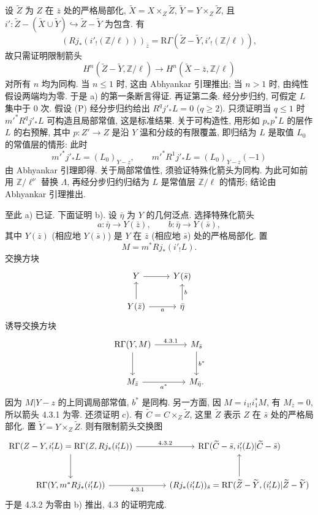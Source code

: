 设 $\widetilde Z$ 为 $Z$ 在 $\bar z$ 处的严格局部化, $\widetilde X=X\times_Z\widetilde Z$, $\widetilde Y=Y\times_Z\widetilde Z$, 且 $i':\widetilde Z-(\widetilde X\cup\widetilde Y)\hookrightarrow \widetilde Z-\widetilde Y$ 为包含. 有
\[
(Rj_*(i'_!(\mathbb Z/\ell)))_{\bar z}
=\mathrm R\Gamma(\widetilde Z-\widetilde Y,i'_!(\mathbb Z/\ell)),
\]
故只需证明限制箭头
\[
H^n(\widetilde Z-\widetilde Y,\mathbb Z/\ell)
\longrightarrow
H^n(\widetilde X-\bar z,\mathbb Z/\ell)
\]
对所有 $n$ 均为同构. 当 $n\le1$ 时, 这由 Abhyankar 引理推出; 当 $n>1$ 时, 由纯性假设两端均为零. 于是 a) 的第一条断言得证. 再证第二条. 经分步归约, 可假定 $L$ 集中于 $0$ 次. 假设 (P) 经分步归约给出 $R^qj'_*L=0$ ($q\ge2$). 只须证明当 $q\le1$ 时 $m'^*R^qj'_*L$ 可构造且局部常值, 这是标准结果. 关于可构造性, 用形如 $p_*p^*L$ 的层作 $L$ 的右预解, 其中 $p:Z'\to Z$ 是沿 $Y$ 温和分歧的有限覆盖, 即归结为 $L$ 是取值 $L_0$ 的常值层的情形: 此时
\[
m'^*j'_*L=(L_0)_{Y-z},
\qquad
m'^*R^1j'_*L=(L_0)_{Y-z}(-1)
\]
由 Abhyankar 引理即得. 关于局部常值性, 须验证特殊化箭头为同构. 为此可如前用 $\mathbb Z/\ell^\nu$ 替换 $\Lambda$, 再经分步归约归结为 $L$ 是常值层 $\mathbb Z/\ell$ 的情形; 结论由 Abhyankar 引理推出.

至此 a) 已证. 下面证明 b). 设 $\bar\eta$ 为 $Y$ 的几何泛点. 选择特殊化箭头
\[
a:\bar\eta\to Y(\bar z),\qquad b:\bar\eta\to Y(\bar s),
\]
其中 $Y(\bar z)$ (相应地 $Y(\bar s)$) 是 $Y$ 在 $\bar z$ (相应地 $\bar s$) 处的严格局部化. 置
\[
M=m^*Rj_*(i'_!L).
\]
交换方块
\[
\begin{tikzcd}
Y \arrow[r] & Y(\bar s)\\
Y(\bar z) \arrow[u] \arrow[r,"a"'] & \bar\eta \arrow[u,"b"']
\end{tikzcd}
\]
诱导交换方块
\[
\begin{tikzcd}[column sep=large,row sep=large]
\mathrm R\Gamma(Y,M) \arrow[r,"4.3.1"] \arrow[d] & M_{\bar s} \arrow[d,"b^*"]\\
M_{\bar z} \arrow[r,"a^*"'] & M_{\bar\eta}.
\end{tikzcd}
\]
因为 $M|Y-z$ 的上同调局部常值, $b^*$ 是同构. 另一方面, 因 $M=i_{1!}i_1^*M$, 有 $M_{\bar z}=0$, 所以箭头 4.3.1 为零. 还须证明 c). 有 $\widetilde C=C\times_Z\widetilde Z$, 这里 $\widetilde Z$ 表示 $Z$ 在 $\bar s$ 处的严格局部化. 置 $\widetilde Y=Y\times_Z\widetilde Z$. 则有限制箭头交换图
\[
\begin{tikzcd}[column sep=large,row sep=large]
\mathrm R\Gamma(Z-Y,i'_!L)=\mathrm R\Gamma(Z,Rj_*(i'_!L))
 \arrow[r,"4.3.2"] \arrow[d]
&
\mathrm R\Gamma(\widetilde C-\bar s,i'_!(L)|\widetilde C-\bar s)\\
\mathrm R\Gamma(Y,m^*Rj_*(i'_!L)) \arrow[r,"4.3.1"']
&
(Rj_*(i'_!L))_{\bar s}
  =\mathrm R\Gamma(\widetilde Z-\widetilde Y,(i'_!L)|\widetilde Z-\widetilde Y) \arrow[u]
\end{tikzcd}
\]
于是 4.3.2 为零由 b) 推出, 4.3 的证明完成.

